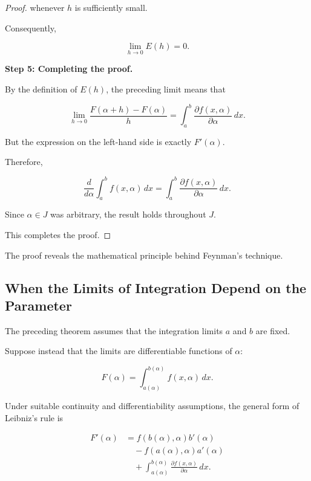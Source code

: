 \documentclass[11pt,a4paper]{article}
\theoremstyle{definition}
\theoremstyle{remark}
\begin{document}
\begin{proof}
whenever $h$ is
sufficiently small.

Consequently,

\begin{equation}
    \lim_{h\to0}E(h)=0.
\end{equation}

\medskip

\textbf{Step 5: Completing the proof.}

By the definition of
$E(h)$, the preceding
limit means that

\[
    \lim_{h\to0}
    \frac{F(\alpha+h)-F(\alpha)}{h}
    =
    \int_a^b
    \frac{\partial f(x,\alpha)}
         {\partial\alpha}\,dx.
\]

But the expression on
the left-hand side is
exactly $F'(\alpha)$.

Therefore,

\begin{equation}
    \boxed{
    \frac{d}{d\alpha}
    \int_a^b f(x,\alpha)\,dx
    =
    \int_a^b
    \frac{\partial f(x,\alpha)}
         {\partial\alpha}\,dx.
    }
\end{equation}

Since $\alpha\in J$ was
arbitrary, the result
holds throughout $J$.

This completes the proof.

\end{proof}

\medskip

The proof reveals the
mathematical principle
behind Feynman's technique.



\subsection{When the Limits of Integration Depend on the Parameter}

The preceding theorem assumes
that the integration limits
$a$ and $b$ are fixed.

Suppose instead that the
limits are differentiable
functions of $\alpha$:

\[
    F(\alpha)
    =
    \int_{a(\alpha)}^{b(\alpha)}
    f(x,\alpha)\,dx.
\]

Under suitable continuity
and differentiability
assumptions, the general
form of Leibniz's rule is

\begin{equation}
\boxed{
\begin{aligned}
    F'(\alpha)
    &=
    f(b(\alpha),\alpha)b'(\alpha)\\
    &\quad-
    f(a(\alpha),\alpha)a'(\alpha)\\
    &\quad+
    \int_{a(\alpha)}^{b(\alpha)}
    \frac{\partial f(x,\alpha)}
         {\partial\alpha}\,dx.
\end{aligned}
}
\label{eq:general_leibniz_rule}
\end{equation}
\end{document}
